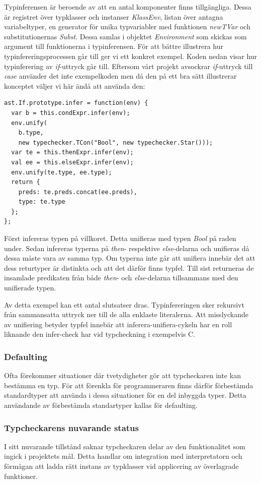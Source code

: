Typinferensen är beroende av att en antal komponenter finns tillgängliga. Dessa är registret över typklasser och instanser \emph{KlassEnv}, listan över antagna variabeltyper, en generator för unika typvariabler med funktionen \emph{newTVar} och substitutionernas \emph{Subst}. Dessa samlas i objektet \emph{Environment} som skickas som argument till funktionerna i typinferensen. 
För att bättre illustrera hur typinfereringsprocessen går till ger vi ett konkret exempel. Koden nedan visar hur typinferering av \emph{if}-uttryck går till. Eftersom vårt projekt avsockrar \emph{if}-uttryck till \emph{case} använder det inte exempelkoden men då den på ett bra sätt illustrerar konceptet väljer vi här ändå att använda den:

\begin{lstlisting}
ast.If.prototype.infer = function(env) {
  var b = this.condExpr.infer(env);
  env.unify(
    b.type,
    new typechecker.TCon("Bool", new typechecker.Star()));
  var te = this.thenExpr.infer(env);
  val ee = this.elseExpr.infer(env);
  env.unify(te.type, ee.type);
  return {
    preds: te.preds.concat(ee.preds),
    type: te.type
  };
};
\end{lstlisting}
Först infereras typen på villkoret. Detta unifieras med typen \emph{Bool} på raden under. Sedan infereras typerna på \emph{then}- respektive \emph{else}-delarna och unifieras då dessa måste vara av samma typ. Om typerna inte går att unifiera innebär det att dess returtyper är distinkta och att det därför finns typfel. Till sist returneras de insamlade predikaten från både \emph{then}- och \emph{else}-delarna tillsammans med den unifierade typen.

Av detta exempel kan ett antal slutsatser dras. Typinfereringen sker rekursivt från sammansatta uttryck ner till de alla enklaste literalerna. Att misslyckande av unifiering betyder typfel innebär att inferera-unifiera-cykeln har en roll liknande den infer-check har vid typcheckning i exempelvis C.

\subsubsection{Defaulting}
Ofta förekommer situationer där tvetydigheter gör att typcheckaren inte kan bestämma en typ. För att förenkla för programmeraren finns därför förbestämda standardtyper att använda i dessa situationer för en del inbyggda typer. Detta användande av förbestämda standartyper kallas för defaulting.

\subsubsection{Typcheckarens nuvarande status}
I sitt nuvarande tillstånd saknar typcheckaren delar av den funktionalitet som ingick i projektets mål. Detta handlar om integration med interpretatorn och förmågan att ladda rätt instans av typklasser vid applicering av överlagrade funktioner. 

